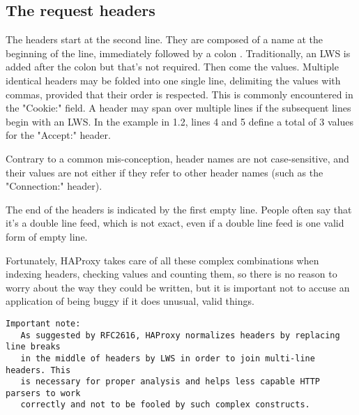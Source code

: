 
\subsection{The request headers}

The headers start at the second line. They are composed of a name at the
beginning of the line, immediately followed by a colon \CHAR{:}. Traditionally,
an LWS is added after the colon but that's not required. Then come the values.
Multiple identical headers may be folded into one single line, delimiting the
values with commas, provided that their order is respected. This is commonly
encountered in the "Cookie:" field. A header may span over multiple lines if
the subsequent lines begin with an LWS. In the example in 1.2, lines 4 and 5
define a total of 3 values for the "Accept:" header.


Contrary to a common mis-conception, header names are not case-sensitive, and
their values are not either if they refer to other header names (such as the
"Connection:" header).


The end of the headers is indicated by the first empty line. People often say
that it's a double line feed, which is not exact, even if a double line feed
is one valid form of empty line.


Fortunately, HAProxy takes care of all these complex combinations when indexing
headers, checking values and counting them, so there is no reason to worry
about the way they could be written, but it is important not to accuse an
application of being buggy if it does unusual, valid things.

\begin{verbatim}
Important note:
   As suggested by RFC2616, HAProxy normalizes headers by replacing line breaks
   in the middle of headers by LWS in order to join multi-line headers. This
   is necessary for proper analysis and helps less capable HTTP parsers to work
   correctly and not to be fooled by such complex constructs.
\end{verbatim}


